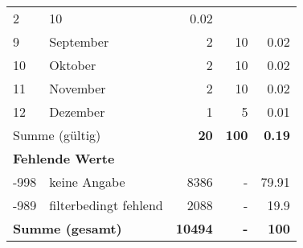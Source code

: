 \begin{longtable}{lXrrr}
       \num{2} &
       \num[round-mode=places,round-precision=2]{10} &
         \num[round-mode=places,round-precision=2]{0.02} \\

     9 &
     \multicolumn{1}{X}{ September   } &


       \num{2} &
       \num[round-mode=places,round-precision=2]{10} &
         \num[round-mode=places,round-precision=2]{0.02} \\

     10 &
     \multicolumn{1}{X}{ Oktober   } &


       \num{2} &
       \num[round-mode=places,round-precision=2]{10} &
         \num[round-mode=places,round-precision=2]{0.02} \\

     11 &
     \multicolumn{1}{X}{ November   } &


       \num{2} &
       \num[round-mode=places,round-precision=2]{10} &
         \num[round-mode=places,round-precision=2]{0.02} \\

     12 &
     \multicolumn{1}{X}{ Dezember   } &


       \num{1} &
       \num[round-mode=places,round-precision=2]{5} &
         \num[round-mode=places,round-precision=2]{0.01} \\
     \midrule
     \multicolumn{2}{l}{Summe (gültig)} &
       \textbf{\num{20}} &
     \textbf{\num{100}} &
       \textbf{\num[round-mode=places,round-precision=2]{0.19}} \\
     \multicolumn{5}{l}{\textbf{Fehlende Werte}}\\
       -998 &
       keine Angabe &
         \num{8386} &
        - &
         \num[round-mode=places,round-precision=2]{79.91} \\
       -989 &
       filterbedingt fehlend &
         \num{2088} &
        - &
         \num[round-mode=places,round-precision=2]{19.9} \\
     \midrule
     \multicolumn{2}{l}{\textbf{Summe (gesamt)}} &
          \textbf{\num{10494}} &
        \textbf{-} &
        \textbf{\num{100}} \\
     \bottomrule
     \end{longtable}
     
